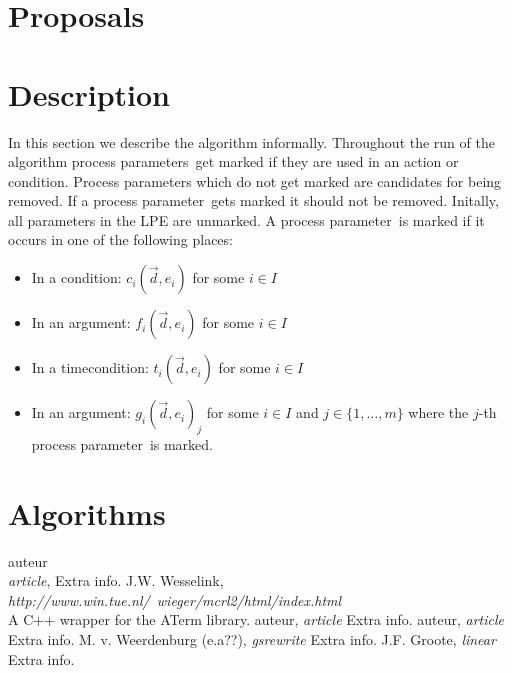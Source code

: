 \documentclass[a4paper,10pt]{article}
\theoremstyle{plain}
\theoremstyle{definition}
\newcommand{\ovr}{\overrightarrow}
\newcommand{\pp}{process parameter}
\newcommand{\pps}{process parameters}
\begin{document}
\section{Proposals}

\section{Description}
In this section we describe the algorithm informally. Throughout the run of the algorithm \pps\ get marked if they are used in an action or condition. Process parameters which do not get marked are candidates for being removed. If a \pp\ gets marked it should not be removed. Initally, all parameters in the LPE are unmarked. A \pp\ is marked if it occurs in one of the following places:

\begin{itemize}
\item In a condition: $c_i(\ovr{d},{e_i})$ for some $i \in I$
\item In an argument: $f_i(\ovr{d},{e_i})$ for some $i \in I$
\item In a timecondition: $t_i(\ovr{d},{e_i})$ for some $i \in I$
\item In an argument: $g_i(\ovr{d},{e_i})_j$ for some $i \in I$ and $j \in \lbrace 1, \ldots , m \rbrace$ where the $j$-th \pp\ is marked.

\end{itemize}

\section{Algorithms} \label{sec:alg}

\begin{thebibliography}{99}   auteur\\
   \textit{article},
   Extra info.
   J.W. Wesselink,
   \textit{http://www.win.tue.nl/~wieger/mcrl2/html/index.html}\\
   A C++ wrapper for the ATerm library.
   auteur,
   \textit{article}
   Extra info.
   auteur,
   \textit{article}
   Extra info.
   M. v. Weerdenburg (e.a??),
   \textit{gsrewrite}
   Extra info.
   J.F. Groote,
   \textit{linear}
   Extra info.

\end{thebibliography}
\end{document}
